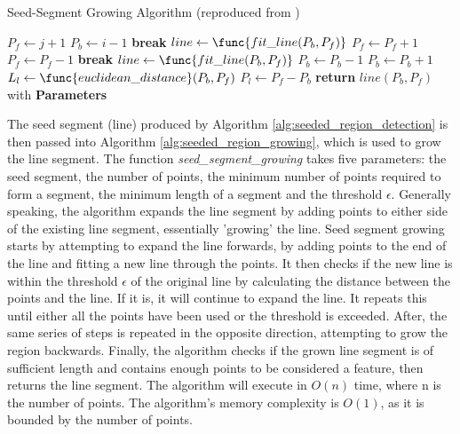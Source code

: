 \documentclass[12pt]{article}
\begin{document}
\begin{algorithm}[H]
    \caption{Seed-Segment Growing Algorithm (reproduced from \cite{seeded_region_growing})}\label{alg:seeded_region_growing}
    \begin{algorithmic}
            \State $P_f \gets j + 1$
            \State $P_b \gets i - 1$
                    \State \textbf{break}
                \Else
                    \State $line \gets \func{fit\_line(P_b, P_f)}$
                \EndIf
                \State $P_f \gets P_f + 1$
            \EndWhile
            \State $P_f \gets P_f - 1$
                    \State \textbf{break}
                \Else
                    \State $line \gets \func{fit\_line(P_b, P_f)}$
                \EndIf
                \State $P_b \gets P_b - 1$
            \EndWhile
            \State $P_b \gets P_b + 1$
            \State $L_l \gets \func{euclidean\_distance}(P_b, P_f)$
            \State $P_l \gets P_f - P_b$
                \State \textbf{return} $line(P_b, P_f)$ with \textbf{Parameters}
            \EndIf
        \EndFunction{}
    \end{algorithmic}
\end{algorithm}
The seed segment (line) produced by Algorithm \ref{alg:seeded_region_detection} is then passed into Algorithm \ref{alg:seeded_region_growing},
which is used to grow the line segment. The function \textit{seed\_segment\_growing} takes five parameters: the seed segment, the number of points,
the minimum number of points required to form a segment, the minimum length of a segment and the threshold $\epsilon$. Generally speaking, the
algorithm expands the line segment by adding points to either side of the existing line segment, essentially 'growing' the line. Seed segment growing
starts by attempting to expand the line forwards, by adding points to the end of the line and fitting a new line through the points. It then checks
if the new line is within the threshold $\epsilon$ of the original line by calculating the distance between the points and the line. If it is, it will continue
to expand the line. It repeats this until either all the points have been used or the threshold is exceeded. After, the same series of steps is repeated in
the opposite direction, attempting to grow the region backwards. Finally, the algorithm checks if the grown line segment is of sufficient length and
contains enough points to be considered a feature, then returns the line segment. The algorithm will execute in \(O(n)\) time, where n is the number of
points. The algorithm's memory complexity is \(O(1)\), as it is bounded by the number of points.\\
\end{document}
